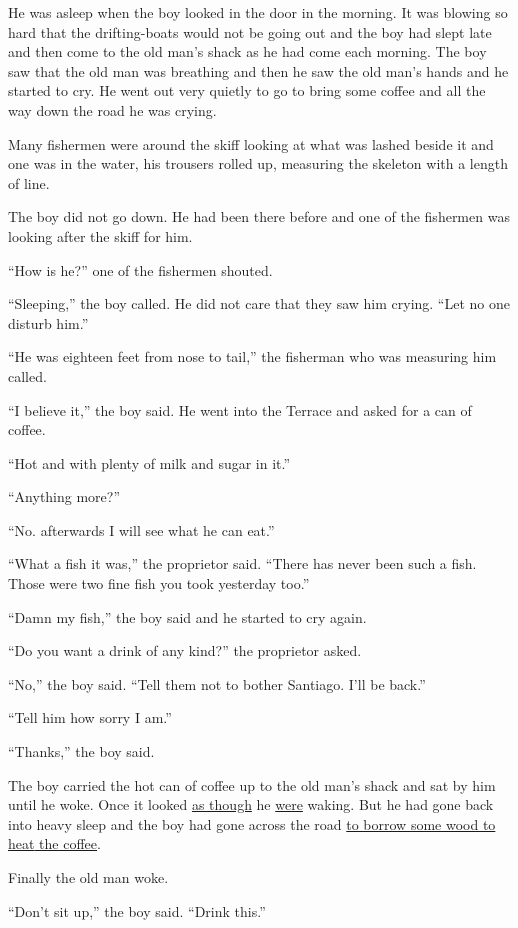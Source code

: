 He was asleep when the boy looked in the door in the morning. It was
blowing so hard that the drifting-boats would not be going out and the boy
had slept late and then come to the old man's shack as he had come each
morning. The boy saw that the old man was breathing and then he saw the old
man's hands and he started to cry. He went out very quietly to go to bring
some coffee and all the way down the road he was crying.

Many fishermen were around the skiff looking at what was lashed beside it
and one was in the water, his trousers rolled up, \gls{measuring} the
\gls{skeleton} with a length of line.

The boy did not go down. He had been there before and one of the fishermen
was looking after the skiff for him.

``How is he?'' one of the fishermen shouted.

``Sleeping,'' the boy called. He did not care that they saw him crying.
``Let no one disturb him.''

``He was eighteen feet from nose to tail,'' the fisherman who was measuring him called.

``I believe it,'' the boy said. He went into the Terrace and asked for a can of coffee.

``Hot and with plenty of milk and sugar in it.''

``Anything more?''

``No. \Gls{afterwards} I will see what he can eat.''

``What a fish it was,'' the \gls{proprietor} said. ``There has never been
such a fish. Those were two fine fish you took yesterday too.''

``Damn my fish,'' the boy said and he started to cry again.

``Do you want a drink of any kind?'' the proprietor asked.

``No,'' the boy said. ``Tell them not to \gls{bother} Santiago. I'll be
back.''

``Tell him how sorry I am.''

``Thanks,'' the boy said.

The boy carried the hot can of coffee up to the old man's shack and sat by
him until he woke. Once it looked \uline{as though} he \uline{were} waking. But he had gone
back into heavy sleep and the boy had gone across the road \uline{to borrow some
wood to \gls{heat} the coffee}.

Finally the old man woke.

``Don't sit up,'' the boy said. ``Drink this.''

